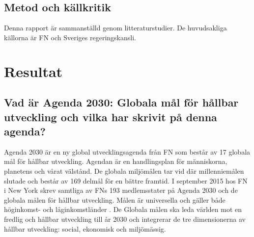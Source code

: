 \documentclass{report}
\begin{document}
\subsection{Metod och källkritik}
Denna rapport är sammanställd genom litteraturstudier. De huvudsakliga källorna är FN och Sveriges regeringskansli. 
\newpage 
\section{Resultat}
\subsection{Vad är Agenda 2030: Globala mål för hållbar utveckling och vilka har skrivit på denna agenda?}
Agenda 2030 är en ny global utvecklingsagenda från FN som består av 17 globala mål för hållbar utveckling. \cite{webUNASweden} Agendan\cite{nam2015transforming} är en handlingsplan för människorna, planetens och vårat välstånd. De globala miljömålen tar vid där millenniemålen slutade och består av 169 delmål för en bättre framtid. I september 2015 hos FN i New York skrev samtliga av FNs 193 medlemsstater på Agenda 2030 och de globala målen för hållbar utveckling.\cite{webUNASweden} Målen är universella och gäller både höginkomst- och låginkomstländer \cite{webUNDP}. De Globala målen ska leda världen mot en fredlig och hållbar utveckling till år 2030 och integrerar de tre dimensionerna av hållbar utveckling: social, ekonomisk och miljömässig.  \cite{webUNASweden}\\
\end{document}
